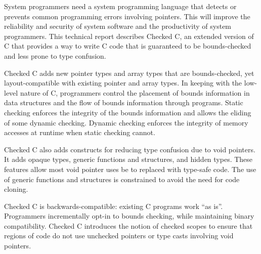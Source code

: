 
\parbox{5.5in}{
System programmers need a system programming language that
detects or prevents common programming errors involving pointers. This
will improve the reliability and security of system software and
the productivity of system programmers. This technical report describes
Checked C, an extended version of C that provides a way to write C code that
is guaranteed to be bounds-checked and less prone to type confusion.
}

\vspace{11pt}

\parbox{5.5in}{
Checked C adds new pointer types and array types that are
bounds-checked, yet layout-compatible with existing pointer and array
types. In keeping with the low-level nature of C, 
programmers control the placement of bounds information in data
structures and the flow of bounds information through programs. Static
checking enforces the integrity of the bounds information and allows the
eliding of some dynamic checking. Dynamic checking enforces the
integrity of memory accesses at runtime when static checking cannot.
}

\vspace{11pt}

\parbox{5.5in}{
Checked C also adds  constructs for reducing type
confusion due to void pointers.  It adds opaque types, generic
functions and structures, and hidden types.  These features allow
most void pointer uses be to replaced with type-safe code.
The use of generic functions and structures is constrained to avoid 
the need for code cloning.
}

\vspace{11pt}

\parbox{5.5in}{
Checked C is backwards-compatible: existing C programs work
``as is''. Programmers incrementally opt-in to bounds checking, while
maintaining binary compatibility.
Checked C introduces the notion of checked scopes to ensure
that regions of code do not use unchecked pointers or type casts
involving void pointers.
}


